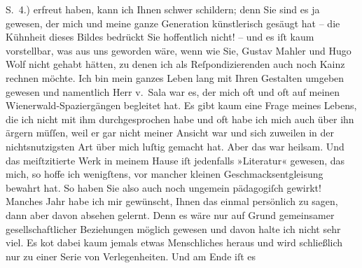 \begin{ledgroupsized}[t]{13cm}
{{{                     S. 4.)}}}\label{K_L02572-2h} erfreut haben, kann ich Ihnen schwer schildern; denn Sie
               sind es ja gewesen, der mich und meine ganze Generation künstlerisch gesäugt hat –
               die Kühnheit dieses Bildes bedrückt Sie hoffentlich nicht! – und es iſt kaum
               vorstellbar, was aus uns geworden wäre, wenn wie Sie, Gustav Mahler und Hugo Wolf nicht gehabt
               hätten, zu denen ich als Reſpondizierenden auch noch Kainz rechnen möchte. Ich bin mein ganzes Leben lang \strikeout{\textcolor{gray}{viel}} mit Ihren Gestalten umgeben gewesen und namentlich Herr v. Sala war es, der mich oft und oft auf
               meinen Wienerwald-Spaziergängen begleitet hat. Es
               gibt kaum eine Frage meines Lebens, die ich nicht mit ihm durchgesprochen habe und
               oft habe ich mich auch über ihn ärgern müſſen, weil er gar nicht meiner Ansicht war
               und sich zuweilen in der nichtsnutzigsten Art über mich luſtig gemacht hat. Aber das
               war heilsam. Und das meiſtzitierte Werk in meinem Hause iſt jedenfalls »Literatur« gewesen, das mich, so hoffe ich
               wenigſtens, vor mancher kleinen Geschmacksentgleisung bewahrt hat. So haben Sie also
               auch noch ungemein pädagogiſch gewirkt!\pend
           \pstart
           {\pb}Manches Jahr habe ich mir gewünscht, Ihnen das einmal
               persönlich zu sagen, dann aber davon absehen gelernt. Denn es wäre nur auf Grund
               gemeinsamer gesellschaftlicher Beziehungen möglich gewesen und davon halte ich nicht
               sehr viel. Es ko{\geminationm}t dabei kaum jemals etwas Menschliches
               heraus und wird schließlich nur zu einer Serie von Verlegenheiten. Und am Ende iſt es

\end{ledgroupsized}
